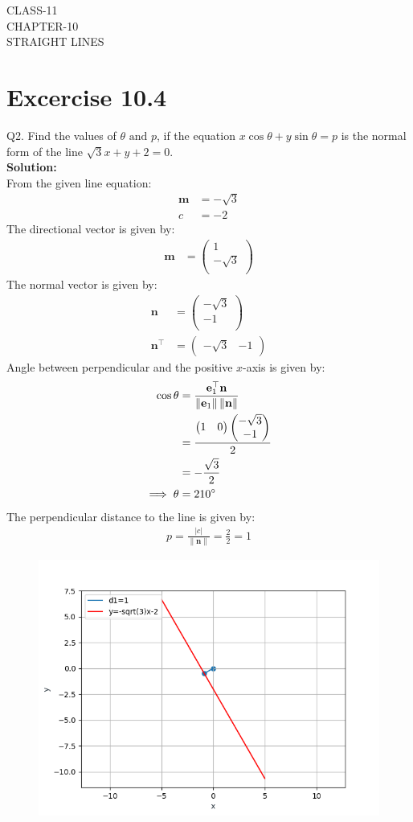 \documentclass[12pt]{article}
\providecommand{\norm}[1]{\left\lVert#1\right\rVert}
\newcommand{\solution}{\noindent \textbf{Solution: }}
\newcommand{\myvec}[1]{\ensuremath{\begin{pmatrix}#1\end{pmatrix}}}
\let\vec\mathbf
\begin{document}
\begin{center}
\textbf\large{CLASS-11 \\ CHAPTER-10 \\ STRAIGHT LINES}
\end{center}
\section*{Excercise 10.4}

Q2. Find the values of $\theta \text{ and } p$, if the equation $x\cos\theta+y\sin\theta=p$ is the normal form
of the line $\sqrt{3}x+y+2=0$.
\\
\solution
\\
From the given line equation:
	\begin{align}
		\vec{m}&=-\sqrt{3}\\
		c&=-2
	\end{align}
        The directional vector is given by:
	\begin{align}
		\vec{m}&=\myvec{1\\-\sqrt{3}\\}
	\end{align}
	The normal vector is given by:
		\begin{align}
	\vec{n}&=\myvec{-\sqrt{3}\\-1\\}\\
	\vec{n}^\top&=\myvec{-\sqrt{3} & -1}
			\end{align}
	Angle between perpendicular and the positive $x$-axis is given by:
		\begin{align}
		\cos\theta&=\frac{\vec{e}_{1}^\top\vec{n}}{\norm{\vec{e}_{1}}\norm{\vec{n}}}\\
			&=\frac{\myvec{1&0\\}\myvec{-\sqrt{3} \\ -1\\}}{2}\\
			&=-\frac{\sqrt{3}}{2}\\
			\implies	\theta&=210\degree
		\end{align}
	The perpendicular distance to the line is given by:
		\begin{align}
			p=\frac{|c|}{\norm{\vec{n}}}=\frac{2}{2}=1
		\end{align}
\begin{figure}[H]
	\begin{center} 
	    \includegraphics[width=\columnwidth]{figs/line.png}
	\end{center}
\caption{}
\label{fig:Fig1}
\end{figure}
\end{document}
